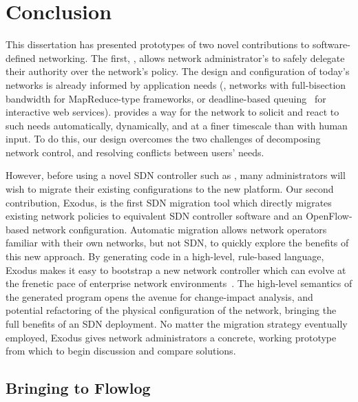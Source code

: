 \chapter{Conclusion}
\label{sec:conclusion}

This dissertation has presented prototypes of two novel contributions to
software-defined networking. The first, \sys, allows network administrator's
to safely delegate their authority over the network's policy.
The design and configuration of today's networks is already informed
by application needs (\eg,
networks with full-bisection bandwidth for MapReduce-type frameworks,
or deadline-based queuing~\cite{Ballani:2011} for interactive web services).
\sys provides a way for the network to solicit and react to such needs
automatically, dynamically, and at a finer timescale than with human input.
To do this, our design overcomes the two challenges of decomposing network
control, and resolving conflicts between users' needs.


However, before using a novel SDN controller such as \sys, many administrators
will wish to migrate their existing configurations to the new platform.
Our second contribution,
Exodus, is the first SDN migration tool which directly migrates existing network
policies to equivalent SDN controller software and an OpenFlow-based
network configuration. Automatic migration allows network operators familiar
with their own networks, but not SDN, to quickly explore the benefits of this new
approach.
By generating code in a high-level, rule-based language, Exodus
makes it easy to bootstrap a new network controller which can evolve
at the frenetic pace of enterprise network environments~\cite{kim11evolution}.
The high-level semantics of the generated program opens the avenue
for change-impact analysis, and potential refactoring of the physical 
configuration of the network, bringing the full benefits of an SDN
deployment.
No matter the migration strategy eventually employed, Exodus gives
network administrators a concrete, working prototype from which to begin
discussion and compare solutions.

\section{Bringing \sys to Flowlog}
\label{sec:pane-in-flowlog}

